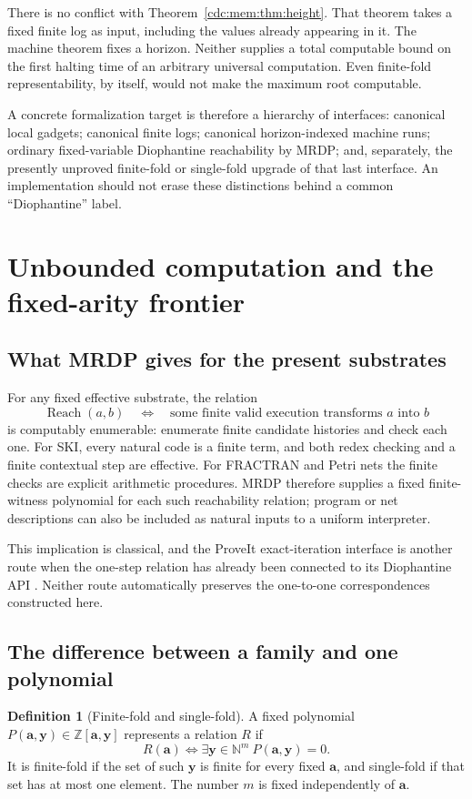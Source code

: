 \documentclass[11pt,a4paper]{article}
\theoremstyle{definition}
\newtheorem{definition}[definition]{Definition}
\theoremstyle{remark}
\newcommand{\N}{\mathbb N}
\newcommand{\Z}{\mathbb Z}
\newcommand{\srctag}[1]{\texorpdfstring{\hspace{0.5em}{\normalfont\small\color{accent}[#1]}}{ [#1]}}
\begin{document}
There is no conflict with Theorem~\ref{cdc:mem:thm:height}. That theorem takes a fixed
finite log as input, including the values already appearing in it. The machine
theorem fixes a horizon. Neither supplies a total computable bound on the
first halting time of an arbitrary universal computation. Even finite-fold
representability, by itself, would not make the maximum root computable.

A concrete formalization target is therefore a hierarchy of interfaces:
canonical local gadgets; canonical finite logs; canonical horizon-indexed
machine runs; ordinary fixed-variable Diophantine reachability by MRDP; and,
separately, the presently unproved finite-fold or single-fold upgrade of that
last interface. An implementation should not erase these distinctions behind
a common ``Diophantine'' label.


\section{Unbounded computation and the fixed-arity frontier\srctag{04}}\label{cdc:wf:sec:frontier}
\subsection{What MRDP gives for the present substrates}
For any fixed effective substrate, the relation
\[
 \operatorname{Reach}(a,b)\quad\Longleftrightarrow\quad
 \text{some finite valid execution transforms $a$ into $b$}
\]
is computably enumerable: enumerate finite candidate histories and check each one. For SKI, every natural code is a finite term, and both redex checking and a finite contextual step are effective. For FRACTRAN and Petri nets the finite checks are explicit arithmetic procedures. MRDP therefore supplies a fixed finite-witness polynomial for each such reachability relation; program or net descriptions can also be included as natural inputs to a uniform interpreter.

This implication is classical, and the ProveIt exact-iteration interface is another route when the one-step relation has already been connected to its Diophantine API \cite{repo-trace}. Neither route automatically preserves the one-to-one correspondences constructed here.

\subsection{The difference between a family and one polynomial}
\begin{definition}[Finite-fold and single-fold]
A fixed polynomial $P(\mathbf a,\mathbf y)\in\Z[\mathbf a,\mathbf y]$ represents a relation $R$ if
\[
 R(\mathbf a)\iff\exists\mathbf y\in\N^m\ P(\mathbf a,\mathbf y)=0.
\]
It is finite-fold if the set of such $\mathbf y$ is finite for every fixed $\mathbf a$, and single-fold if that set has at most one element. The number $m$ is fixed independently of $\mathbf a$.
\end{definition}
\end{document}
